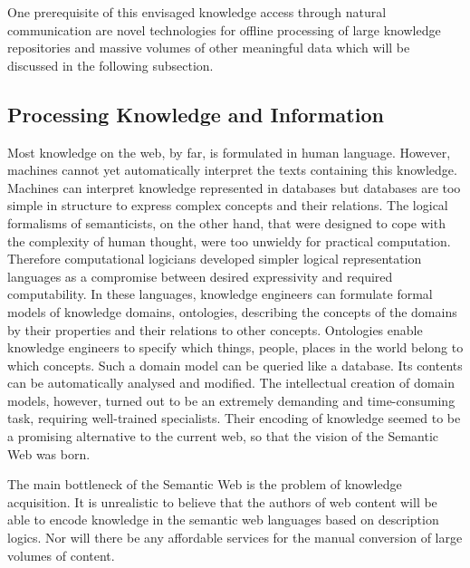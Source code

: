 \documentclass[10pt, plain]{../../metanetpaper}
\begin{document}
\begin{multicols}{2}
One prerequisite of this envisaged knowledge access through natural communication are novel technologies for offline processing of large knowledge repositories and massive volumes of other meaningful data which will be discussed in the following subsection.  

\subsection{Processing Knowledge and Information}
\label{sec:proc-knowl-inform}

Most knowledge on the web, by far, is formulated in human language. However, machines cannot yet automatically interpret the texts containing this knowledge. Machines can interpret knowledge represented in databases but databases are too simple in structure to express complex concepts and their relations. The logical formalisms of semanticists, on the other hand, that were designed to cope with the complexity of human thought, were too unwieldy for practical computation. Therefore computational logicians developed simpler logical representation languages as a compromise between desired expressivity and required computability. In these languages, knowledge engineers can formulate formal models of knowledge domains, ontologies,  describing the concepts of the domains by their properties and their relations to other concepts. Ontologies enable knowledge engineers to specify which things, people, places in the world belong to which concepts. Such a domain model can be queried like a database. Its contents can be automatically analysed and modified. The intellectual creation of domain models, however, turned out to be an extremely demanding and time-consuming task, requiring well-trained specialists. Their encoding of knowledge seemed to be a promising alternative to the current web, so that the vision of the Semantic Web was born. 
 
The main bottleneck of the Semantic Web is the problem of knowledge acquisition. It is unrealistic to believe that the authors of web content will be able to encode knowledge in the semantic web languages based on description logics. Nor will there be any affordable services for the manual conversion of large volumes of content.
 

\end{multicols}
\end{document}
